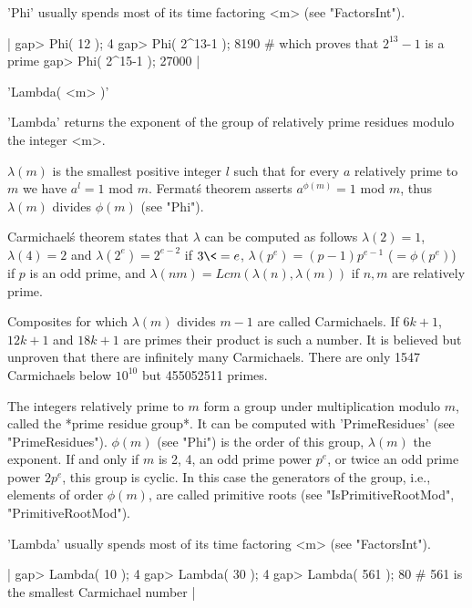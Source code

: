 'Phi' usually spends most of its time factoring <m> (see "FactorsInt").

|    gap> Phi( 12 );
    4
    gap> Phi( 2^13-1 );
    8190        # which proves that $2^{13}-1$ is a prime
    gap> Phi( 2^15-1 );
    27000 |

%
%
%

'Lambda( <m> )'

'Lambda' returns the  exponent of the group  of relatively prime residues
modulo the integer <m>.

$\lambda(m)$ is the smallest positive integer $l$ such that for every $a$
relatively  prime  to $m$  we have  $a^l=1$  mod  $m$.  Fermat\'s theorem
asserts $a^{\phi(m)}=1$ mod $m$, thus $\lambda(m)$ divides $\phi(m)$ (see
"Phi").

Carmichael\'s theorem states that  $\lambda$ can  be computed as  follows
$\lambda(2)=1$, $\lambda(4)=2$ and $\lambda(2^e) = 2^{e-2}$ if $3 \<= e$,
$\lambda(p^e) = (p-1) p^{e-1}$  ($= \phi(p^e)$) if $p$ is  an  odd prime,
and  $\lambda(n m) = Lcm(\lambda(n),\lambda(m))$ if $n, m$ are relatively
prime.

Composites for which $\lambda(m)$ divides $m - 1$ are called Carmichaels.
If $6k+1$, $12k+1$ and $18k+1$ are primes their product is such a number.
It is believed but unproven that there are infinitely  many  Carmichaels.
There are only  1547  Carmichaels below $10^{10}$ but  455052511  primes.

The  integers  relatively prime to  $m$ form a group under multiplication
modulo $m$, called the *prime residue group*.   It can  be  computed with
'PrimeResidues'  (see   "PrimeResidues").   $\phi(m)$ (see "Phi")  is the
order of this group, $\lambda(m)$ the exponent.  If and only if $m$ is 2,
4, an odd prime  power $p^e$, or  twice an odd prime  power $2 p^e$, this
group is cyclic.   In   this  case   the  generators of the  group, i.e.,
elements   of  order   $\phi(m)$,   are   called  primitive   roots  (see
"IsPrimitiveRootMod", "PrimitiveRootMod").

'Lambda'    usually  spends  most   of    its  time factoring <m>    (see
"FactorsInt").

|    gap> Lambda( 10 );
    4
    gap> Lambda( 30 );
    4
    gap> Lambda( 561 );
    80        # 561 is the smallest Carmichael number |

